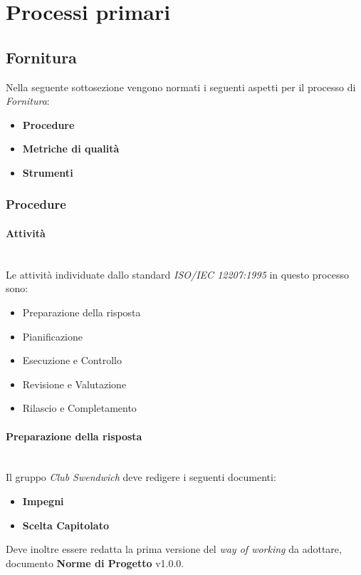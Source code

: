 \section{Processi primari}

\subsection{Fornitura}
Nella seguente sottosezione vengono normati i seguenti aspetti per il 
processo di \textit{Fornitura}:
\begin{itemize}
    \item \textbf{Procedure}
    \item \textbf{Metriche di qualità}
    \item \textbf{Strumenti}
\end{itemize}

\subsubsection{Procedure}

\paragraph{Attività}
\mbox{} \\
Le attività individuate dallo standard \textit{ISO/IEC 12207:1995} in questo processo sono:
\begin{itemize}
    \item Preparazione della risposta
    \item Pianificazione
    \item Esecuzione e Controllo
    \item Revisione e Valutazione
    \item Rilascio e Completamento
\end{itemize}

\paragraph{Preparazione della risposta}
\mbox{} \\
Il gruppo \textit{Club Swendwich} deve redigere i seguenti documenti:
\begin{itemize}
    \item \textbf{Impegni}
    \item \textbf{Scelta Capitolato}
\end{itemize}
Deve inoltre essere redatta la prima versione del \textit{way of working} da adottare, documento \textbf{Norme di Progetto} v1.0.0.

